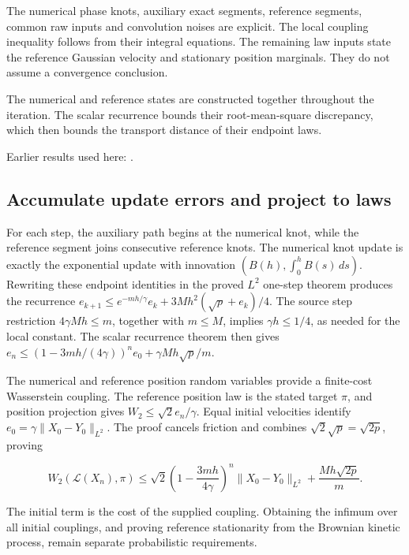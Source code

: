 \documentclass[11pt,a4paper]{report}
\begin{document}
The numerical phase knots, auxiliary exact segments, reference segments, common raw inputs and convolution noises are explicit. The local coupling inequality follows from their integral equations. The remaining law inputs state the reference Gaussian velocity and stationary position marginals. They do not assume a convergence conclusion.



The numerical and reference states are constructed together throughout the iteration. The scalar recurrence bounds their root-mean-square discrepancy, which then bounds the transport distance of their endpoint laws.



Earlier results used here: \cite[Section~3.17]{LangevinLean2026ULASC}.
\subsection{\texorpdfstring{Accumulate update errors and project to laws}{Accumulate update errors and project to laws}}
\label{report-step-KineticLangevin-LpConvergence-lean-1}


For each step, the auxiliary path begins at the numerical knot, while the reference segment joins consecutive reference knots. The numerical knot update is exactly the exponential update with innovation \((B(h),\int_0^hB(s)\,ds)\). Rewriting these endpoint identities in the proved \(L^{2}\) one-step theorem produces the recurrence \(e_{k+1}\le e^{-mh/\gamma}e_k+3Mh^2(\sqrt p+e_k)/4\). The source step restriction \(4\gamma Mh\le m\), together with \(m\le M\), implies \(\gamma h\le1/4\), as needed for the local constant. The scalar recurrence theorem then gives \(e_n\le(1-3mh/(4\gamma))^ne_0+\gamma Mh\sqrt p/m\).



The numerical and reference position random variables provide a finite-cost Wasserstein coupling. The reference position law is the stated target \(\pi\), and position projection gives \(W_2\le\sqrt2e_n/\gamma\). Equal initial velocities identify \(e_0=\gamma\|X_0-Y_0\|_{L^2}\). The proof cancels friction and combines \(\sqrt2\sqrt p=\sqrt{2p}\), proving

\[W_2(\mathcal L(X_n),\pi)\le\sqrt2\left(1-\frac{3mh}{4\gamma}\right)^n\|X_0-Y_0\|_{L^2}+\frac{Mh\sqrt{2p}}m.\]

The initial term is the cost of the supplied coupling. Obtaining the infimum over all initial couplings, and proving reference stationarity from the Brownian kinetic process, remain separate probabilistic requirements.
\end{document}
